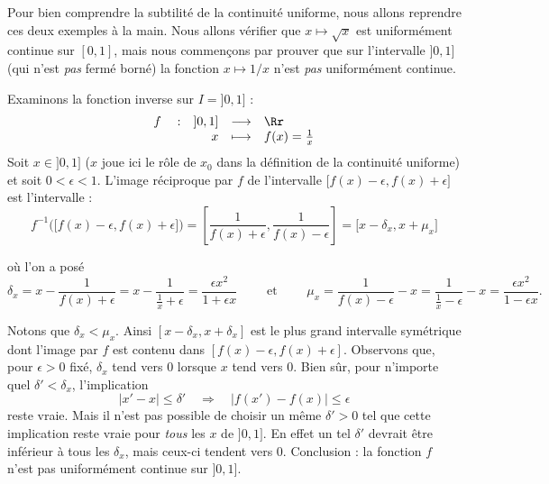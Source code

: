 \documentclass[class=report,crop=false]{standalone}
\begin{document}
Pour bien comprendre la subtilité de la continuité uniforme, nous allons reprendre ces deux exemples à la main.
Nous allons vérifier que $x\mapsto \sqrt{x}$ est uniformément continue sur
$[0,1]$, mais nous commençons par prouver que sur l'intervalle $]0,1]$ (qui n'est \emph{pas} fermé borné)
la fonction $x\mapsto 1/x$ n'est \emph{pas} uniformément continue.


\begin{exemple}
Examinons la fonction inverse sur $I=]0,1]$ :
$$
\begin{array}{rcl}
f \quad : \quad ]0,1]&\longrightarrow&\Rr\\
x&\longmapsto&f(x)=\frac1x
\end{array}
$$
Soit $x \in ]0,1]$ ($x$ joue ici le rôle de $x_0$ dans la définition de la continuité uniforme)
et soit $0<\epsilon<1$. 
L'image réciproque par $f$ de l'intervalle $\big[f(x)-\epsilon,f(x)+\epsilon\big]$ est l'intervalle :
$$f^{-1}\Big(\big[f(x)-\epsilon,f(x)+\epsilon\big]\Big)= 
\left[\frac{1}{f(x)+\epsilon},\frac{1}{f(x)-\epsilon}\right]
= \big[x-\delta_x,x+\mu_x \big]$$


où l'on a posé
$$\delta_x = x-\frac{1}{f(x)+\epsilon} = x-\frac{1}{\frac1x+\epsilon} 
= \frac{\epsilon x^2}{1+\epsilon x}
\qquad\text{ et }\qquad
\mu_x = \frac{1}{f(x)-\epsilon}-x = \frac{1}{\frac1x-\epsilon} - x 
= \frac{\epsilon x^2}{1-\epsilon x}.$$

Notons que $\delta_x < \mu_x$.
Ainsi $[x-\delta_x,x+\delta_x]$ est le plus grand intervalle symétrique
dont l'image par $f$ est contenu dans $[f(x)-\epsilon,f(x)+\epsilon]$. 
Observons que, pour $\epsilon>0$ fixé, $\delta_x$ tend
vers $0$ lorsque $x$ tend vers $0$.  
Bien sûr, pour n'importe quel
$\delta'<\delta_x$, l'implication
$$|x'-x|\le \delta' \quad\Longrightarrow\quad \big|f(x')-f(x)\big| \le \epsilon$$
reste vraie. 
Mais il n'est pas possible de choisir un même $\delta'>0$
tel que cette implication reste vraie pour \emph{tous} les $x$ de $]0,1]$.
En effet un tel $\delta'$ devrait être inférieur à tous les $\delta_x$,
mais ceux-ci tendent vers $0$.
Conclusion : la fonction $f$ n'est pas uniformément continue sur $]0,1]$.  
\end{exemple}
\end{document}
